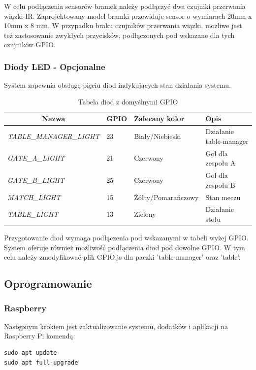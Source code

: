W celu podłączenia sensorów bramek należy podłączyć dwa czujniki przerwania wiązki IR. Zaprojektowany model bramki przewiduje sensor o wymiarach 20mm x 10mm x 8 mm. W przypadku braku czujników przerwania wiązki, możliwe jest też zastosowanie zwykłych przycisków, podłączonych pod wskazane dla tych czujników GPIO.

\subsubsection{Diody LED - Opcjonalne}
System zapewnia obsługę pięciu diod indykujących stan działania systemu.

\begin{table}[h!]
\centering
\begin{tabular}{|l|l|l|l|}
\hline
\multicolumn{1}{|c|}{\textbf{Nazwa}} & \multicolumn{1}{c|}{\textbf{GPIO}} & \textbf{Zalecany kolor} & \textbf{Opis} \\ \hline
\textit{TABLE\_MANAGER\_LIGHT} & 23 & Biały/Niebieski & Działanie table-manager \\ \hline
\textit{GATE\_A\_LIGHT} & 21 & Czerwony & Gol dla zespołu A \\ \hline
\textit{GATE\_B\_LIGHT} & 25 & Czerwony & Gol dla zespołu B \\ \hline
\textit{MATCH\_LIGHT} & 15 & Żółty/Pomarańczowy & Stan meczu \\ \hline
\textit{TABLE\_LIGHT} & 13 & Zielony & Działanie stołu \\ \hline
\end{tabular}
\caption{Tabela diod z domyślnymi GPIO}
\end{table}

Przygotowanie diod wymaga podłączenia pod wskazanymi w tabeli wyżej GPIO. System oferuje również możliwość podłączenia diod pod dowolne GPIO. W tym celu należy zmodyfikować plik GPIO.js dla paczki 'table-manager' oraz 'table'.

\subsection{Oprogramowanie}

\subsubsection{Raspberry}

Następnym krokiem jest zaktualizowanie systemu, dodatków i aplikacji na Raspberry Pi komendą:

\begin{lstlisting}
sudo apt update
sudo apt full-upgrade
\end{lstlisting}

